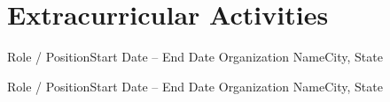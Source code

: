 \section{Extracurricular Activities}
  \resumeSubHeadingListStart

    \resumeSubheading
      {Role / Position}{Start Date -- End Date}
      {Organization Name}{City, State}
      \resumeItemListStart
      \resumeItemListEnd

    \resumeSubheading
      {Role / Position}{Start Date -- End Date}
      {Organization Name}{City, State}
      \resumeItemListStart
      \resumeItemListEnd

  \resumeSubHeadingListEnd
